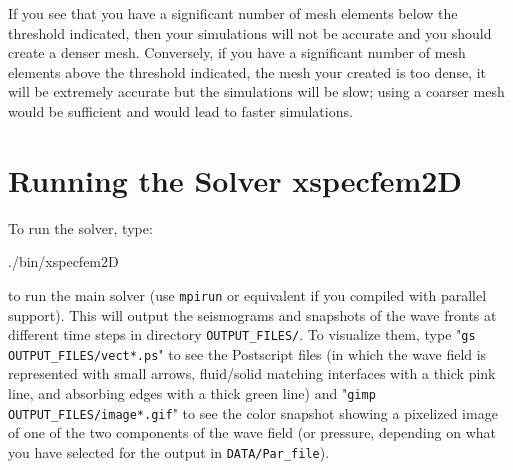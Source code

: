 \documentclass[oneside,english,onecolumn,letterpaper]{book}
\newenvironment{lyxcode}
{\begin{list}{}{
\setlength{\rightmargin}{\leftmargin}
\setlength{\listparindent}{0pt}%
\raggedright
\setlength{\itemsep}{0pt}
\setlength{\parsep}{0pt}
\normalfont\ttfamily}%
 \item[]}
{\end{list}}
\begin{document}
\noindent If you see that you have a significant number of mesh elements below the threshold indicated, then your simulations
will not be accurate and you should create a denser mesh. Conversely, if you have a significant number of mesh elements above the threshold indicated,
the mesh your created is too dense, it will be extremely accurate but the simulations will be slow; using a coarser mesh would be sufficient and would lead to faster simulations.


\chapter{Running the Solver xspecfem2D}


To run the solver, type:
\begin{lyxcode}
./bin/xspecfem2D
\end{lyxcode}
to run the main solver (use \texttt{mpirun} or equivalent if you compiled with parallel support). This will output the seismograms and snapshots of the wave fronts at different time steps in directory \texttt{OUTPUT\_FILES/}. To visualize them, type "\texttt{gs OUTPUT\_FILES/vect*.ps}" to see the Postscript files (in which the wave field is represented with small arrows, fluid/solid matching interfaces with a thick pink line, and absorbing edges with a thick green line) and "\texttt{gimp OUTPUT\_FILES/image*.gif}" to see the color snapshot showing a pixelized image of one of the two components of the wave field (or pressure, depending on what you have selected for the output in \texttt{DATA/Par\_file}).
\end{document}
